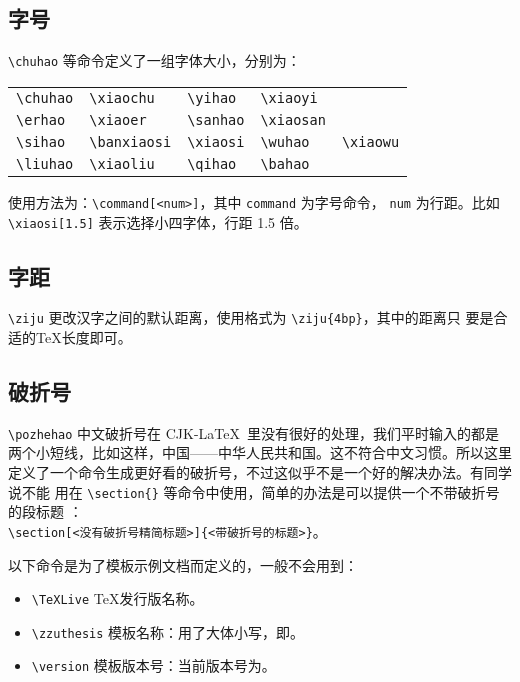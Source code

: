 \subsection*{字号}

\verb|\chuhao| 等命令定义了一组字体大小，分别为：

\begin{center}
\begin{tabular}{lllll}
\hline
\verb|\chuhao|&\verb|\xiaochu|&\verb|\yihao|&\verb|\xiaoyi|&\\
\verb|\erhao|&\verb|\xiaoer|&\verb|\sanhao|&\verb|\xiaosan|&\\
\verb|\sihao|&\verb|\banxiaosi|&\verb|\xiaosi|&\verb|\wuhao|&\verb|\xiaowu|\\
\verb|\liuhao|&\verb|\xiaoliu|&\verb|\qihao|&\verb|\bahao|&\\\hline
\end{tabular}
\end{center}

使用方法为：\verb|\command[<num>]|，其中 \texttt{command} 为字号命令，
\texttt{num} 为行距。比如 \verb|\xiaosi[1.5]| 表示选择小四字体，行距 1.5 倍。

\subsection*{字距}

\verb|\ziju| 更改汉字之间的默认距离，使用格式为 \verb|\ziju{4bp}|，其中的距离只
要是合适的\TeX{}长度即可。

\subsection*{破折号}

\verb|\pozhehao| 中文破折号在 CJK-\LaTeX\ 里没有很好的处理，我们平时输入的都是
两个小短线，比如这样，{\hei 中国——中华人民共和国}。这不符合中文习惯。所以这里
定义了一个命令生成更好看的破折号，不过这似乎不是一个好的解决办法。有同学说不能
用在 \verb|\section{}| 等命令中使用，简单的办法是可以提供一个不带破折号的段标题
：\\
\verb|\section[<没有破折号精简标题>]{<带破折号的标题>}|。

以下命令是为了模板示例文档而定义的，一般不会用到：
\begin{itemize}
  \item \verb|\TeXLive| \TeX{}发行版名称。
  \item \verb|\zzuthesis| 模板名称：用了大体小写，即\zzuthesis{}。
  \item \verb|\version| 模板版本号：当前版本号为\version。
\end{itemize}

